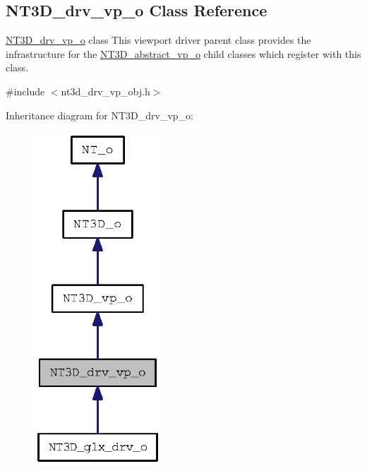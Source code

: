 \subsection{NT3D\_\-drv\_\-vp\_\-o Class Reference}
\label{class_n_t3_d__drv__vp__o}


\hyperlink{class_n_t3_d__drv__vp__o}{NT3D\_\-drv\_\-vp\_\-o} class This viewport driver parent class provides the infrastructure for the \hyperlink{class_n_t3_d__abstract__vp__o}{NT3D\_\-abstract\_\-vp\_\-o} child classes which register with this class.  




{\ttfamily \#include $<$nt3d\_\-drv\_\-vp\_\-obj.h$>$}



Inheritance diagram for NT3D\_\-drv\_\-vp\_\-o:
\nopagebreak
\begin{figure}[H]
\begin{center}
\leavevmode
\includegraphics[width=136pt]{class_n_t3_d__drv__vp__o__inherit__graph}
\end{center}
\end{figure}


